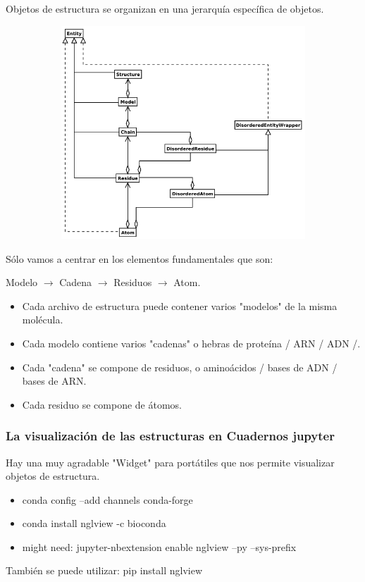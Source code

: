 \documentclass[a4paper]{article}
\begin{document}
Objetos de estructura se organizan en una jerarquía específica de objetos.

\begin{center}
	\includegraphics[width=16cm,height=8cm]{struct.png}
\end{center}

\noindent Sólo vamos a centrar en los elementos fundamentales que son: 

Modelo $\rightarrow$ Cadena $\rightarrow$ Residuos $\rightarrow$ Atom.

\begin{itemize}

\item Cada archivo de estructura puede contener varios "modelos" de la misma molécula.
\item Cada modelo contiene varios "cadenas" o hebras de proteína / ARN / ADN /.
\item Cada "cadena" se compone de residuos, o aminoácidos / bases de ADN / bases de ARN.
\item Cada residuo se compone de átomos.
	
\end{itemize}
\subsubsection{La visualización de las estructuras en Cuadernos jupyter}

Hay una muy agradable "Widget" para portátiles que nos permite visualizar objetos de estructura.

\begin{itemize}

\item conda config --add channels conda-forge
\item conda install nglview -c bioconda
\item might need: jupyter-nbextension enable nglview --py --sys-prefix

\end{itemize}
También se puede utilizar: pip install nglview
\end{document}
